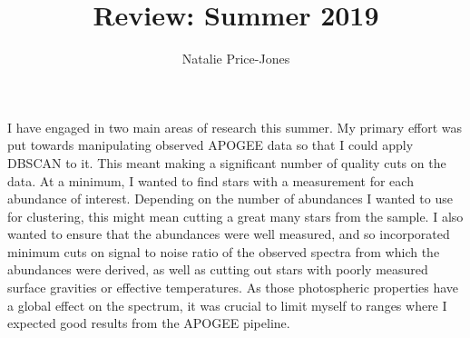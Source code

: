 \documentclass[11pt]{article}
\begin{document}
\author{Natalie Price-Jones}
\title{Review: Summer 2019}
\maketitle

\medskip

I have engaged in two main areas of research this summer. My primary effort was put towards manipulating observed APOGEE data so that I could apply DBSCAN to it. This meant making a significant number of quality cuts on the data. At a minimum, I wanted to find stars with a measurement for each abundance of interest. Depending on the number of abundances I wanted to use for clustering, this might mean cutting a great many stars from the sample. I also wanted to ensure that the abundances were well measured, and so incorporated minimum cuts on signal to noise ratio of the observed spectra from which the abundances were derived, as well as cutting out stars with poorly measured surface gravities or effective temperatures. As those photospheric properties have a global effect on the spectrum, it was crucial to limit myself to ranges where I expected good results from the APOGEE pipeline. 
\end{document}
